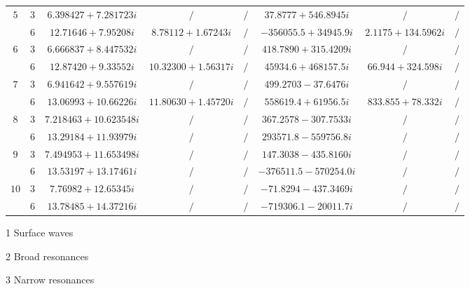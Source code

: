 \documentclass[aps,prd,longbibliography,reprint,twocolumn,amsmath,amssymb,amsfonts,showpacs,superscriptaddress]{revtex4-1}%
\begin{document}
\begin{table}[htp]
\begin{threeparttable}[htp]
\begin{ruledtabular}
\begin{tabular}{cccccccc}
$5$  & $3$  & $6.398427+7.281723 i $  & $ /$  & $/ $  & $37.8777+546.8945 i $ & $ /$ & $/ $  \\
     & $6$  & $  12.71646+7.95208 i $  & $ 8.78112+1.67243 i  $  & $ /$  & $ -356055.5+34945.9 i$ & $ 2.1175+134.5962 i $ & $/ $  \\

$6$  & $3$  & $ 6.666837+8.447532 i $  & $/ $  & $ /$  & $418.7890+315.4209 i$ & $/ $ & $/ $  \\
     & $6$  & $ 12.87420+9.33552 i $  & $ 10.32300+1.56317 i$  & $/ $  & $45934.6+468157.5 i $ & $ 66.944+324.598 i$ & $/ $  \\

$7$  & $3$  & $ 6.941642+9.557619 i $  & $ /$  & $/ $  & $499.2703-37.6476 i $ & $ /$ & $ /$  \\
     & $6$  & $13.06993+10.66226 i $  & $ 11.80630+1.45720 i  $  & $ /$  & $558619.4+61956.5 i $ & $ 833.855+78.332 i $ & $/ $  \\

$8$  & $3$  & $7.218463+10.623548 i $  & $ /$  & $/ $  & $ 367.2578-307.7533 i  $ & $ /$ & $/ $  \\
     & $6$  & $13.29184+11.93979 i $  & $/ $  & $/ $  & $ 293571.8-559756.8 i $ & $/ $ & $/ $  \\

$9$  & $3$  & $ 7.494953+11.653498 i $  & $/ $  & $/ $  & $147.3038-435.8160 i  $ & $ /$ & $/ $  \\
     & $6$  & $ 13.53197+13.17461 i  $  & $/ $  & $/ $  & $ -376511.5-570254.0 i  $ & $/$ & $ /$  \\

$10$ & $3$  & $7.76982+12.65345 i $  & $/ $  & $/ $  & $-71.8294-437.3469 i  $ & $/ $ & $ /$  \\
     & $6$  & $ 13.78485+14.37216 i$  & $ /$  & $/ $  & $ -719306.1-20011.7 i $ & $ /$ & $/ $  \\

\end{tabular}
\end{ruledtabular}
\begin{tablenotes}
     \item[1] Surface waves
     \item[2] Broad resonances
     \item[3] Narrow  resonances
   \end{tablenotes}
\end{threeparttable}
\end{table}
\endgroup
\end{document}
